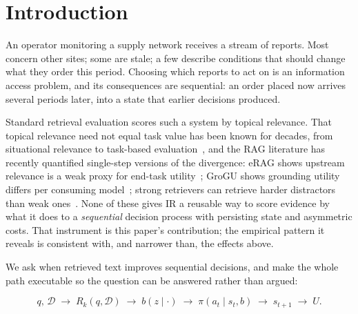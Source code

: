 \documentclass[runningheads]{llncs}
\begin{document}
\begin{abstract}
comparisons directionally negative but Holm-n.s., except random/C3/14B
$+11.0$, an abstention-fallback cell), while oracle-selected
evidence from
the same corpus adds up to $+178$; a relevance-to-factual refinement gap of $0.00$ and a
downstream control gap of $+456.8$ locate the loss. Relevance-only evaluation
cannot see the consumer dependence we measure: a retriever$\times$consumer
interaction that survives Holm correction for rule-vs-LLM contrasts. Every
table regenerates from stored episodes; all analysis code, model pins and
randomisation are frozen.
\end{abstract}

\section{Introduction}
\label{sec:intro}

An operator monitoring a supply network receives a stream of reports. Most
concern other sites; some are stale; a few describe conditions that should
change what they order this period. Choosing which reports to act on is an
information access problem, and its consequences are sequential: an order
placed now arrives several periods later, into a state that earlier decisions
produced.

Standard retrieval evaluation scores such a system by topical relevance. That
topical relevance need not equal task value has been known for decades, from
situational relevance to task-based evaluation~\cite{borlund2003concept}, and
the RAG literature has recently quantified single-step versions of the
divergence: eRAG shows upstream relevance is a weak proxy for end-task
utility~\cite{salemi2024erag}; GroGU shows grounding utility differs per
consuming model~\cite{grogu2026}; strong retrievers can retrieve harder
distractors than weak ones~\cite{cuconasu2024power,yoran2024making}. None of
these gives IR a reusable way to score evidence by what it does to a
\emph{sequential} decision process with persisting state and asymmetric costs.
That instrument is this paper's contribution; the empirical pattern it reveals
is consistent with, and narrower than, the effects above.

We ask when retrieved text improves sequential decisions, and make the whole
path executable so the question can be answered rather than argued:

\begin{equation}
\label{eq:path}
q,\,\mathcal{D} \;\longrightarrow\; R_k(q,\mathcal{D}) \;\longrightarrow\;
b(z\mid \cdot) \;\longrightarrow\; \pi(a_t\mid s_t,b) \;\longrightarrow\;
s_{t+1} \;\longrightarrow\; U.
\end{equation}
\end{document}
